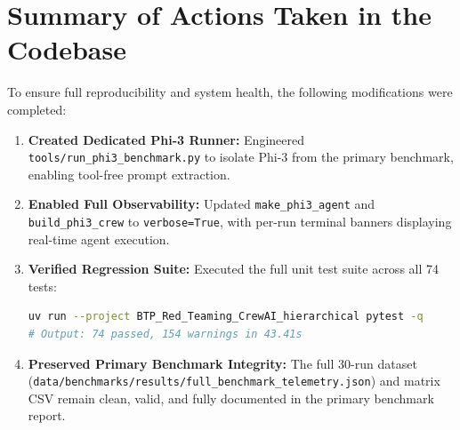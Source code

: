 \documentclass[10pt,a4paper]{article}
\begin{document}
\section{Summary of Actions Taken in the Codebase}

To ensure full reproducibility and system health, the following modifications were completed:
\begin{enumerate}
    \item \textbf{Created Dedicated Phi-3 Runner:} Engineered \texttt{tools/run\_phi3\_benchmark.py} to isolate Phi-3 from the primary benchmark, enabling tool-free prompt extraction.
    \item \textbf{Enabled Full Observability:} Updated \texttt{make\_phi3\_agent} and \texttt{build\_phi3\_crew} to \texttt{verbose=True}, with per-run terminal banners displaying real-time agent execution.
    \item \textbf{Verified Regression Suite:} Executed the full unit test suite across all 74 tests:
    \begin{lstlisting}[language=bash]
uv run --project BTP_Red_Teaming_CrewAI_hierarchical pytest -q
# Output: 74 passed, 154 warnings in 43.41s
    \end{lstlisting}
    \item \textbf{Preserved Primary Benchmark Integrity:} The full 30-run dataset (\texttt{data/benchmarks/results/full\_benchmark\_telemetry.json}) and matrix CSV remain clean, valid, and fully documented in the primary benchmark report.
\end{enumerate}
\end{document}
